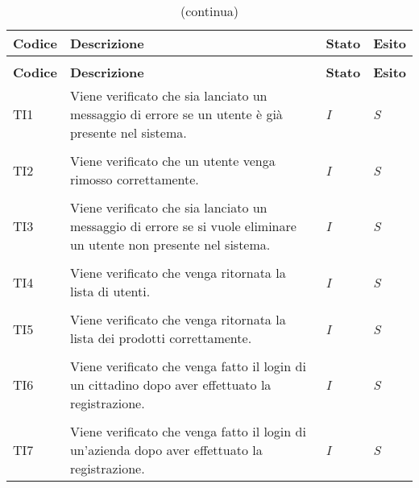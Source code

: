 		\begin{longtable}{ >{\centering}p{} >{}p{}
				>{\centering}p{} >{\centering}p{}}
			
			\caption{Riepilogo test di integrazione}\\	
			\rowcolorhead
			\textbf{\color{white}Codice} 
			& \centering\textbf{\color{white}Descrizione} 
			& \centering\textbf{\color{white}Stato}
			& \centering\textbf{\color{white}Esito} 
			\tabularnewline %
			\endfirsthead	
			
			\rowcolor{white}\caption[]{(continua)}\\	
			\rowcolorhead
			\textbf{\color{white}Codice} 
			& \centering\textbf{\centering\color{white}Descrizione} 
			& \centering\textbf{\color{white}Stato}
			& \centering\textbf{\color{white}Esito} 
			\tabularnewline %
			\endhead	
			
			
			\hypertarget{TI1}{TI1} & Viene verificato che sia lanciato un messaggio di 
			errore se un utente è già presente nel sistema. & \textit{I} & \textit{S}\\ 
			
			\tabularnewline
			\hypertarget{TI2}{TI2} & Viene verificato che un utente venga rimosso 
			correttamente. & \textit{I} & \textit{S}\\
			
			\tabularnewline
			\hypertarget{TI3}{TI3} & Viene verificato che sia lanciato un messaggio di 
			errore se si vuole eliminare un utente non presente nel sistema. & \textit{I} & 
			\textit{S}\\
			
			\tabularnewline
			\hypertarget{TI4}{TI4} & Viene verificato che venga ritornata la lista di 
			utenti. & \textit{I} & \textit{S}\\
			
			\tabularnewline
			\hypertarget{TI5}{TI5} & Viene verificato che venga ritornata la lista dei 
			prodotti correttamente. & \textit{I} & \textit{S}\\
			
			\tabularnewline
			\hypertarget{TI6}{TI6} & Viene verificato che venga fatto il login di un 
			cittadino dopo aver effettuato la registrazione. & \textit{I} & \textit{S}\\
			
			\tabularnewline
			\hypertarget{TI7}{TI7} & Viene verificato che venga fatto il login di 
			un'azienda dopo aver effettuato la registrazione. & \textit{I} & \textit{S}\\
			

\end{longtable}
